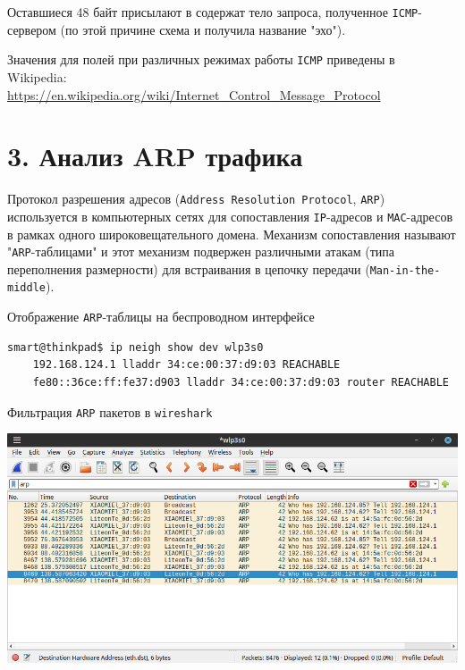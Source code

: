 Оставшиеся 48 байт присылают в содержат тело запроса, полученное \texttt{ICMP}-сервером (по этой причине схема и получила название "эхо").


Значения для полей при различных режимах работы \texttt{ICMP} приведены в Wikipedia:\\\url{https://en.wikipedia.org/wiki/Internet_Control_Message_Protocol}

\section*{3. Анализ ARP трафика}

Протокол разрешения адресов (\texttt{Address Resolution Protocol}, \texttt{ARP}) используется в компьютерных сетях для сопоставления \texttt{IP}-адресов и \texttt{MAC}-адресов в рамках одного широковещательного домена. Механизм сопоставления называют "\texttt{ARP}-таблицами" и этот механизм подвержен различными атакам (типа переполнения размерности) для встраивания в цепочку передачи (\texttt{Man-in-the-middle}).

Отображение \texttt{ARP}-таблицы на беспроводном интерфейсе
\begin{Verbatim}[frame=single]
    smart@thinkpad$ ip neigh show dev wlp3s0
    192.168.124.1 lladdr 34:ce:00:37:d9:03 REACHABLE 
    fe80::36ce:ff:fe37:d903 lladdr 34:ce:00:37:d9:03 router REACHABLE 
\end{Verbatim}

Фильтрация \texttt{ARP} пакетов в \texttt{wireshark}
\begin{center}
    \includegraphics[scale=0.6]{res/5.wireshark-arp.png}
\end{center}

